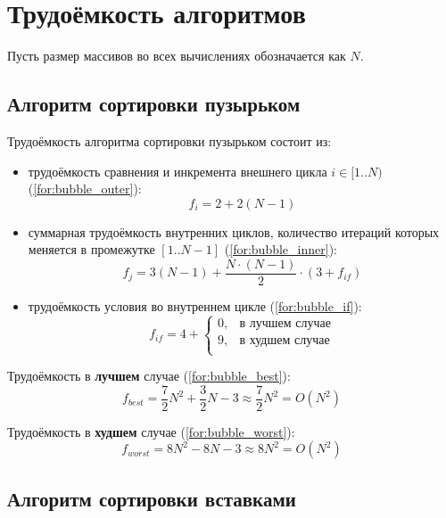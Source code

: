 \section{Трудоёмкость алгоритмов}

Пусть размер массивов во всех вычислениях обозначается как $N$.

\subsection{Алгоритм сортировки пузырьком}

Трудоёмкость алгоритма сортировки пузырьком состоит из:
\begin{itemize}
	\item трудоёмкость сравнения и инкремента внешнего цикла $i \in [1..N)$ (\ref{for:bubble_outer}):
	\begin{equation}
	\label{for:bubble_outer}
	f_{i} = 2 + 2(N - 1)
	\end{equation}
	\item суммарная трудоёмкость внутренних циклов, количество итераций которых меняется в промежутке $[1..N-1]$ (\ref{for:bubble_inner}):
	\begin{equation}
	\label{for:bubble_inner}
	f_{j} = 3(N - 1) + \frac{N \cdot (N - 1)}{2} \cdot (3 + f_{if})
	\end{equation}
	\item трудоёмкость условия во внутреннем цикле (\ref{for:bubble_if}):
	\begin{equation}
	\label{for:bubble_if}
	f_{if} = 4 + \begin{cases}
	0, & \text{в лучшем случае}\\
	9, & \text{в худшем случае}\\
	\end{cases}
	\end{equation}
\end{itemize}

Трудоёмкость в \textbf{лучшем} случае (\ref{for:bubble_best}):
\begin{equation}
\label{for:bubble_best}
f_{best} = \frac{7}{2} N^2 + \frac{3}{2} N - 3 \approx \frac{7}{2} N^2 = O(N^2)
\end{equation}

Трудоёмкость в \textbf{худшем} случае (\ref{for:bubble_worst}):
\begin{equation}
\label{for:bubble_worst}
f_{worst} =  8N^2 - 8N - 3 \approx 8N^2 = O(N^2)
\end{equation}

\subsection{Алгоритм сортировки вставками}

